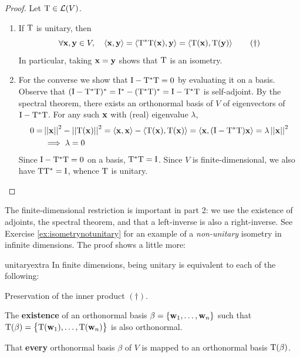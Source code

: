 \begin{proof}
	Let $\mathrm{T}\in\mathcal{L}(V)$.
	\begin{enumerate}
	  \item If $\mathrm{T}$ is unitary, then
		\[
			\forall{\mathbf{x}},{\mathbf{y}}\in V, \quad
			\left\langle {\mathbf{x}},{\mathbf{y}}\right\rangle =\left\langle \mathrm{T}^*\mathrm{T}({\mathbf{x}}),{\mathbf{y}}\right\rangle
			=\left\langle \mathrm{T}({\mathbf{x}}),\mathrm{T}({\mathbf{y}})\right\rangle \tag{$\dag$}
		\]
		In particular, taking ${\mathbf{x}}={\mathbf{y}}$ shows that $\mathrm{T}$ is an isometry.
		\item For the converse we show that $\mathrm{I}-\mathrm{T}^*\mathrm{T}=0$ by evaluating it on a basis. Observe that $(\mathrm{I}-\mathrm{T}^*\mathrm{T})^*=\mathrm{I}^*-(\mathrm{T}^*\mathrm{T})^*=\mathrm{I}-\mathrm{T}^*\mathrm{T}$ is self-adjoint. By the spectral theorem, there exists an orthonormal basis of $V$ of eigenvectors of $\mathrm{I}-\mathrm{T}^*\mathrm{T}$. For any such ${\mathbf{x}}$ with (real) eigenvalue $\lambda$,
		\begin{align*}
			0=
			&\left| \left| {\mathbf{x}}\right|\right|^2-\left| \left| \mathrm{T}({\mathbf{x}})\right|\right|^2
			=\left\langle {\mathbf{x}},{\mathbf{x}}\right\rangle-\left\langle \mathrm{T}({\mathbf{x}}),\mathrm{T}({\mathbf{x}})\right\rangle
			=\left\langle {\mathbf{x}},(\mathrm{I}-\mathrm{T}^*\mathrm{T}){\mathbf{x}}\right\rangle
			=\lambda\left| \left| {\mathbf{x}}\right|\right|^2\\
			&\implies\lambda=0
		\end{align*}
		Since $\mathrm{I}-\mathrm{T}^*\mathrm{T}=0$ on a basis, $\mathrm{T}^*\mathrm{T}=\mathrm{I}$. Since $V$ is finite-dimensional, we also have $\mathrm{T}\mathrm{T}^*=\mathrm{I}$, whence $\mathrm{T}$ is unitary.\qedhere
	\end{enumerate} 
\end{proof}

The finite-dimensional restriction is important in part 2: we use the existence of adjoints, the spectral theorem, and that a left-inverse is also a right-inverse. See Exercise \ref{ex:isometrynotunitary} for an example of a \emph{non-unitary} isometry in infinite dimensions.\smallbreak
The proof shows a little more:

\begin{cor}{}{unitaryextra}
	In finite dimensions, being unitary is equivalent to each of the following:
	\begin{enumeratea}
		\item Preservation of the inner product\footnotemark{} $(\dag)$. 
	 	\item The \textbf{existence} of an orthonormal basis $\beta=\{{\mathbf{{\mathbf{w}}}}_1,\ldots,{\mathbf{{\mathbf{w}}}}_{n}\}$ such that $\mathrm{T}(\beta)=\big\{\mathrm{T}({\mathbf{w}}_1),\ldots,\mathrm{T}({\mathbf{w}}_n)\big\}$ is also orthonormal.
	 	\item That \textbf{every} orthonormal basis $\beta$ of $V$ is mapped to an orthonormal basis $\mathrm{T}(\beta)$.
	\end{enumeratea} 
\end{cor}


